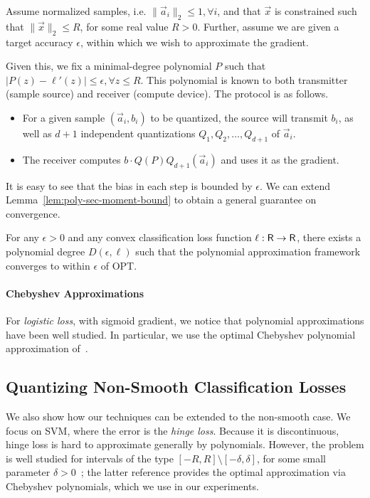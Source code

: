 Assume normalized samples, i.e. $\| \vec{a}_i \|_2 \leq 1, \forall i$, and that $\vec{x}$ is constrained such that $\| \vec{x} \|_2 \leq R$, for some real value $R > 0$. Further, assume we are given a target accuracy $\epsilon$, within which we wish to approximate the gradient. 

Given this, we fix a minimal-degree polynomial $P$ such that $|P(z) - \ell'(z)| \leq \epsilon, \forall z \leq R$. This polynomial is known to both transmitter (sample source) and receiver (compute device). The protocol is as follows. 
\vspace{-0.5em}
\begin{itemize}
    \vspace{-0.5em}
	\item For a given sample $(\vec{a}_i, b_i)$ to be quantized, the source will transmit $b_i$, as well as $d + 1$ independent quantizations $Q_1, Q_2, \ldots, Q_{d + 1}$ of $\vec{a}_i$. 
    \vspace{-0.5em}
	\item The receiver computes $b \cdot Q(P) Q_{d + 1} ( \vec{a}_i )$ and uses it as the gradient.
\end{itemize}

\vspace{-0.5em}
It is easy to see that the bias in each step is bounded by $\epsilon$. 
We can extend Lemma~\ref{lem:poly-sec-moment-bound} to obtain a general guarantee on convergence. 

\begin{lemma}
	For any $\epsilon > 0$ and any convex classification loss function $\ell: \mathsf{R} \rightarrow \mathsf{R}$, there exists a polynomial degree $D(\epsilon, \ell)$ such that the polynomial approximation framework converges to within $\epsilon$ of OPT.  
\end{lemma}

\vspace{-0.5em}
\paragraph{Chebyshev Approximations} 
For \emph{logistic loss}, with sigmoid gradient, we notice that polynomial approximations have been well studied. In particular, we use the optimal Chebyshev polynomial approximation of~\cite{vlcek2012chebyshev}. 

\subsection{Quantizing Non-Smooth Classification Losses}
We also show how our techniques can be extended to the non-smooth case.
We focus on SVM, where the error is the \emph{hinge loss}.
Because it is discontinuous, hinge loss is hard to approximate generally by polynomials. 
However, the problem is well studied for intervals of the type  $[-R, R] \setminus [-\delta, \delta]$, for some small parameter $\delta > 0$~\cite{frostig2016principal, allen2016faster}; the latter reference provides the optimal approximation via Chebyshev polynomials, which we use in our experiments. 

